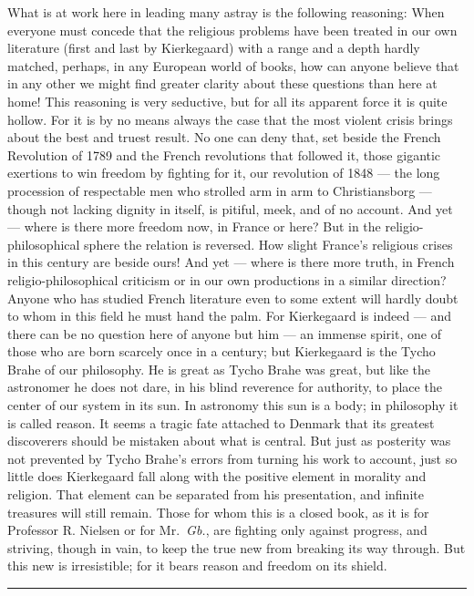 \documentclass[12pt,a4paper,openany]{book}
\newcommand{\piecerule}{\par\begin{center}\rule{1.5cm}{0.4pt}\end{center}\par}
\newcommand{\opage}[1]{\marginnote{\footnotesize\textit{[#1]}}}
\begin{document}
What is at work here in leading many astray is the following reasoning:
When everyone must concede that the religious problems have been treated
in our own literature (first and last by Kierkegaard) with a range and a
depth hardly matched, perhaps, in any European world of books, how can
anyone believe that in any other we might find greater clarity about
these questions than here at home! This reasoning is very seductive, but
for all its apparent force it is quite hollow. For it is by no means
always the case that the most violent crisis brings about the best and
truest result. No one can deny that, set beside the French Revolution of
1789 and the French revolutions that followed it, those gigantic
exertions to win freedom by fighting for it, our revolution of 1848 ---
the long procession of respectable men who strolled arm in arm to
Christiansborg --- though not lacking dignity in itself, is pitiful,
meek, and of no account. And yet --- where is there more freedom now, in
France or here? But in the religio-philosophical sphere the relation is
reversed. How slight France's religious crises in this century are
beside ours! And yet --- where is there more
\opage{97}truth, in French religio-philosophical criticism or in our own
productions in a similar direction? Anyone who has studied French
literature even to some extent will hardly doubt to whom in this field he
must hand the palm. For Kierkegaard is indeed --- and there can be no
question here of anyone but him --- an immense spirit, one of those who
are born scarcely once in a century; but Kierkegaard is the Tycho Brahe
of our philosophy. He is great as Tycho Brahe was great, but like the
astronomer he does not dare, in his blind reverence for authority, to
place the center of our system in its sun. In astronomy this sun is a
body; in philosophy it is called reason. It seems a tragic fate attached
to Denmark that its greatest discoverers should be mistaken about what is
central. But just as posterity was not prevented by Tycho Brahe's errors
from turning his work to account, just so little does Kierkegaard fall
along with the positive element in morality and religion. That element
can be separated from his presentation, and infinite treasures will still
remain. Those for whom this is a closed book, as it is for Professor R.
Nielsen or for Mr.~\emph{Gb.}, are fighting only against progress, and
striving, though in vain, to keep the true new from breaking its way
through. But this new is irresistible; for it bears reason and freedom on
its shield.
\piecerule
\end{document}
